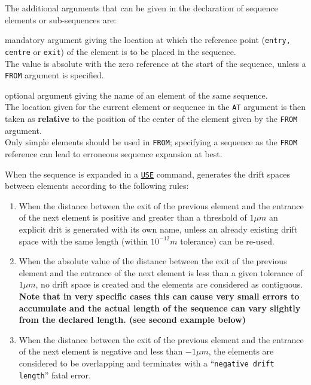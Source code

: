 The additional arguments that can be given in the declaration of sequence 
elements or sub-sequences are: 
\begin{madlist}
   mandatory argument giving the location at
  which the reference point (\texttt{entry, centre} or \texttt{exit}) of
  the element is to be placed in the sequence. \\
  The value is absolute with the zero reference at the start of the
  sequence, unless a \texttt{FROM} argument is specified.

   optional argument giving the name of an
  element of the same sequence. \\
  The location given for the current element or sequence in the \texttt{AT}
  argument is then taken as \textbf{relative}  to the position of the
  center of the element given by the \texttt{FROM} argument. \\
  Only simple elements should be used in \texttt{FROM}; specifying a
  sequence as the \texttt{FROM} reference can lead to erroneous sequence
  expansion at best. 
\end{madlist}


When the sequence is expanded in a \hyperref[sec:use]{\texttt{USE}} 
command, \madx generates the drift spaces between elements according to
the following rules: 
\begin{enumerate}
\item When the distance between the exit of the previous element and the
  entrance of the next element is positive and greater than a threshold
  of $1 \mu m$ an explicit drit is generated with its own name, unless
  an already existing drift space with the same length (within $10^{-12}
  m$ tolerance) can be re-used.
\item When the absolute value of the distance between the exit of the 
  previous element and the entrance of the next element is less than a
  given tolerance of $1\mu m$, no drift space is created and the
  elements are considered as contiguous. \\
  \textbf{Note that in very specific cases this can cause very small errors
    to accumulate and the actual length of the sequence can vary
    slightly from the declared length. (see second example below)} 
\item When the distance between the exit of the previous element and the 
  entrance of the next element is negative and less than $-1\mu m$,
  the elements are considered to be overlapping and \madx terminates
  with a ``\texttt{negative drift length}'' fatal error. 
\end{enumerate} 

